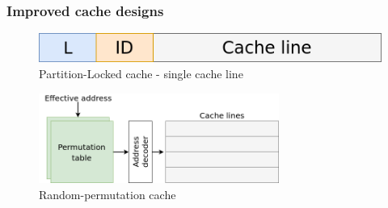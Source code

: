 \documentclass[10pt,usenames,dvipsnames]{beamer}
\begin{document}



\begin{frame}
\frametitle{Improved cache designs}
\begin{figure}[h]
\centering
\includegraphics[width=\textwidth]{pl-cache}
\caption{Partition-Locked cache - single cache line}
\end{figure}

\begin{figure}[h]
\centering
\includegraphics[width=0.7\textwidth]{rp-cache}
\caption{Random-permutation cache}
\end{figure}
\end{frame}
\end{document}
